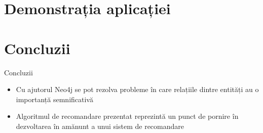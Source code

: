 \documentclass{beamer}
\begin{document}
\section{Demonstrația aplicației}
\frame{\tableofcontents[currentsection]}

\section{Concluzii}
\frame{\tableofcontents[currentsection]}
\begin{frame}{Concluzii}
	\begin{itemize}
	    \item Cu ajutorul Neo4j se pot rezolva probleme în care relațiile dintre entități au o importanță semnificativă
	    \item Algoritmul de recomandare prezentat reprezintă un punct de pornire în dezvoltarea în amănunt a unui sistem de recomandare
	\end{itemize}
\end{frame}
\end{document}

